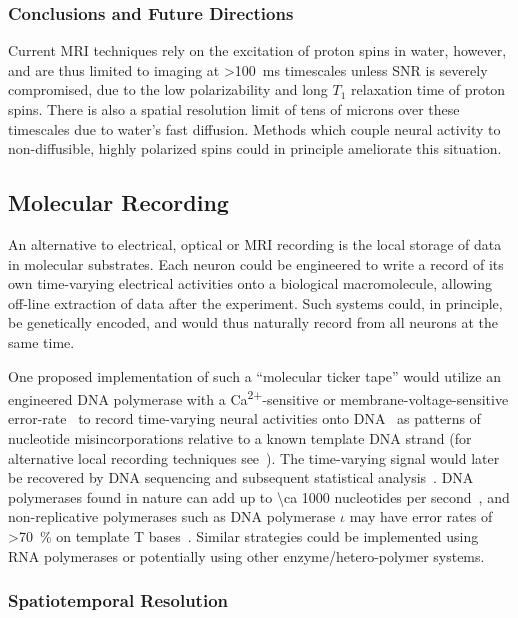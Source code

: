 \subsubsection{Conclusions and Future Directions}

Current MRI techniques rely on the excitation of proton spins in water, however, and are thus limited to imaging at \SI{>100}{\ms} timescales unless SNR is severely compromised, due to the low polarizability and long $T_1$ relaxation time of proton spins.
There is also a spatial resolution limit of tens of microns over these timescales due to water's fast diffusion. Methods which couple neural activity to non-diffusible, highly polarized spins could in principle ameliorate this situation.

\subsection{Molecular Recording}

An alternative to electrical, optical or MRI recording is the local storage of data in molecular substrates.
Each neuron could be engineered to write a record of its own time-varying electrical activities onto a biological macromolecule, allowing off-line extraction of data after the experiment.
Such systems could, in principle, be genetically encoded, and would thus naturally record from all neurons at the same time.

One proposed implementation of such a ``molecular ticker tape'' would utilize an engineered DNA polymerase with a Ca\textsuperscript{2$+$}-sensitive or membrane-voltage-sensitive error-rate~\cite{zamft12} to record time-varying neural activities onto DNA~\cite{glaser13} as patterns of nucleotide misincorporations relative to a known template DNA strand (for alternative local recording techniques see~\cite{friedland09,bonnet13}).
The time-varying signal would later be recovered by DNA sequencing and subsequent statistical analysis~\cite{glaser13}.
DNA polymerases found in nature can add up to \num{\ca 1000} nucleotides per second~\cite{kelman95}, and non-replicative polymerases such as DNA polymerase $\iota$ may have error rates of \SI{>70}{\percent} on template T bases~\cite{frank07}.
Similar strategies could be implemented using RNA polymerases or potentially using other enzyme/hetero-polymer systems.

\subsubsection{Spatiotemporal Resolution}

